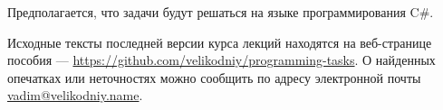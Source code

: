 
\lipsum[1-7]

Предполагается, что задачи будут решаться на языке программирования
C\#.

Исходные тексты последней версии курса лекций находятся на
веб-странице пособия —
\url{https://github.com/velikodniy/programming-tasks}. О найденных
опечатках или неточностях можно сообщить по адресу электронной почты
\href{mailto:vadim@veikodniy.name}{vadim@velikodniy.name}.

